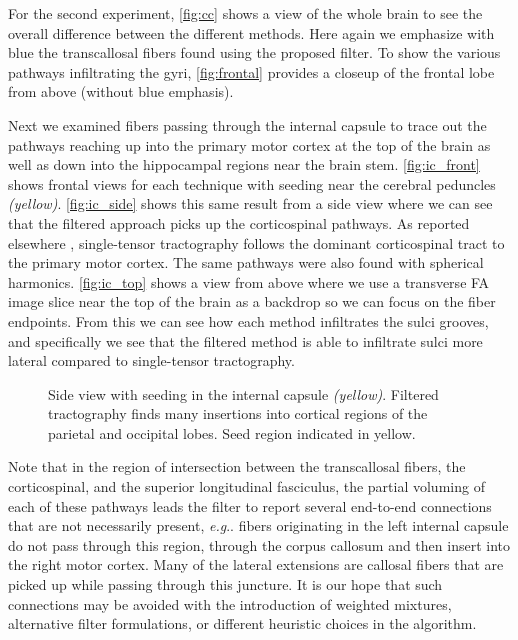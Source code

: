 \documentclass[letterpaper,hyperref,12pt]{gatech-thesis}
\makeatletter
\DeclareRobustCommand\onedot{\futurelet\@let@token\@onedot}
\def\@onedot{\ifx\@let@token.\else.\null\fi\xspace}
\newcommand{\eg}{\textit{e.g}\onedot}
\makeatother
\begin{document}
For the second experiment, \autoref{fig:cc} shows a view of the whole brain to
see the overall difference between the different methods.  Here again we
emphasize with blue the transcallosal fibers found using the proposed filter.
To show the various pathways infiltrating the gyri, \autoref{fig:frontal}
provides a closeup of the frontal lobe from above (without blue emphasis).

Next we examined fibers passing through the internal capsule to trace out the
pathways reaching up into the primary motor cortex at the top of the brain as
well as down into the hippocampal regions near the brain stem.
\autoref{fig:ic_front} shows frontal views for each technique with seeding
near the cerebral peduncles \textit{(yellow)}.  \autoref{fig:ic_side} shows
this same result from a side view where we can see that the filtered approach
picks up the corticospinal pathways.  As reported elsewhere
\cite{Behrens2007}, single-tensor tractography follows the dominant
corticospinal tract to the primary motor cortex.  The same pathways were also
found with spherical harmonics.
%
\autoref{fig:ic_top} shows a view from above where we use a transverse FA
image slice near the top of the brain as a backdrop so we can focus on the
fiber endpoints.  From this we can see how each method infiltrates the sulci
grooves, and specifically we see that the filtered method is able to
infiltrate sulci more lateral compared to single-tensor tractography.

\begin{figure*}[t]
  \centering
 \caption{Side view with seeding in the internal capsule \textit{(yellow)}.
    Filtered tractography finds many insertions into cortical regions of the
    parietal and occipital lobes.  Seed region indicated in yellow.}
  \label{fig:ic_side}
\end{figure*}

Note that in the region of intersection between the transcallosal fibers, the
corticospinal, and the superior longitudinal fasciculus, the partial voluming
of each of these pathways leads the filter to report several end-to-end
connections that are not necessarily present, \eg fibers originating in the
left internal capsule do not pass through this region, through the corpus
callosum and then insert into the right motor cortex.  Many of the lateral
extensions are callosal fibers that are picked up while passing through this
juncture.  It is our hope that such connections may be avoided with the
introduction of weighted mixtures, alternative filter formulations, or
different heuristic choices in the algorithm.
\end{document}
